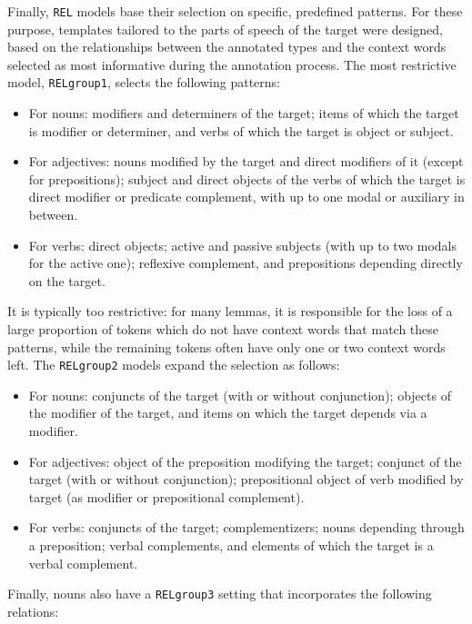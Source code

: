 \documentclass[
]{book}
\providecommand{\tightlist}{%
  \setlength{\itemsep}{0pt}\setlength{\parskip}{0pt}}
\begin{document}
Finally, \texttt{REL} models base their selection on specific, predefined patterns. For these purpose, templates tailored to the parts of speech of the target were designed, based on the relationships between the annotated types and the context words selected as most informative during the annotation process. The most restrictive model, \texttt{RELgroup1}, selects the following patterns:

\begin{itemize}
\tightlist
\item
  For nouns: modifiers and determiners of the target; items of which the target is modifier or determiner, and verbs of which the target is object or subject.
\item
  For adjectives: nouns modified by the target and direct modifiers of it (except for prepositions); subject and direct objects of the verbs of which the target is direct modifier or predicate complement, with up to one modal or auxiliary in between.
\item
  For verbs: direct objects; active and passive subjects (with up to two modals for the active one); reflexive complement, and prepositions depending directly on the target.
\end{itemize}

It is typically too restrictive: for many lemmas, it is responsible for the loss of a large proportion of tokens which do not have context words that match these patterns, while the remaining tokens often have only one or two context words left. The \texttt{RELgroup2} models expand the selection as follows:

\begin{itemize}
\tightlist
\item
  For nouns: conjuncts of the target (with or without conjunction); objects of the modifier of the target, and items on which the target depends via a modifier.
\item
  For adjectives: object of the preposition modifying the target; conjunct of the target (with or without conjunction); prepositional object of verb modified by target (as modifier or prepositional complement).
\item
  For verbs: conjuncts of the target; complementizers; nouns depending through a preposition; verbal complements, and elements of which the target is a verbal complement.
\end{itemize}

Finally, nouns also have a \texttt{RELgroup3} setting that incorporates the following relations:
\end{document}
